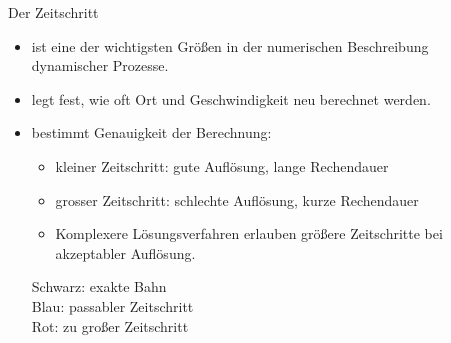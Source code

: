 \documentclass[
  a0paper,
  portrait,
  fontscale=.35 %
  ]{baposterrptu}
\begin{document}
\begin{poster}
  \begin{posterbox}[name=zeitschritt,column=1,row=0]{Der Zeitschritt}
    \begin{itemize}
      \item ist eine der wichtigsten Größen in der numerischen Beschreibung\\ dynamischer Prozesse.
      \item legt fest, wie oft Ort und Geschwindigkeit neu berechnet werden. 
      \item bestimmt Genauigkeit der Berechnung:
      \begin{itemize}
        \item kleiner Zeitschritt: gute Auflösung, lange Rechendauer
        \item grosser Zeitschritt: schlechte Auflösung, kurze Rechendauer
        \item Komplexere Lösungsverfahren erlauben größere Zeitschritte bei akzeptabler Auflösung.
      \end{itemize}
      \begin{minipage}{.45\textwidth}
      
      \end{minipage}
      \begin{minipage}{.45\textwidth}
      Schwarz: exakte Bahn\\
      {\color{blue} Blau: passabler Zeitschritt}\\
      {\color{red} Rot: zu großer Zeitschritt}
      \end{minipage}
    \end{itemize}

  \end{posterbox}


\end{poster}
\end{document}
